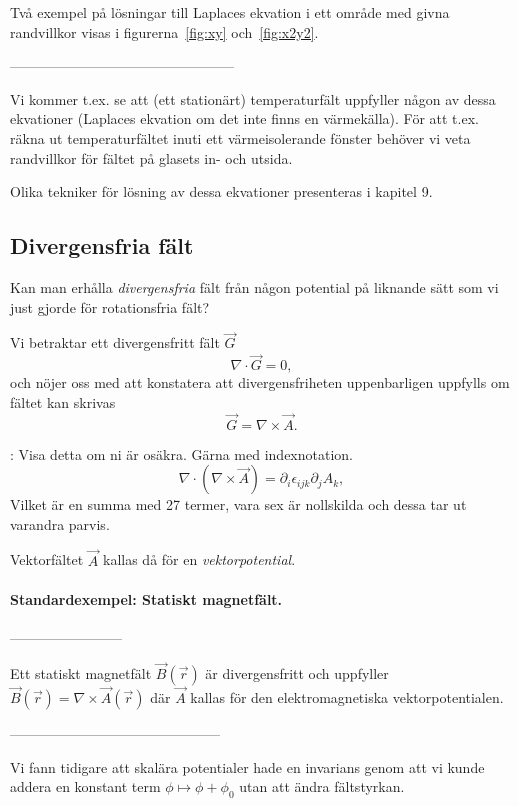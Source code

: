 \documentclass[%
oneside,                 %
final,                   %
10pt]{article}
\newcommand{\longinlinecomment}[3]{{\color{red}{\bf #1}: #2}}
\begin{document}
Två exempel på lösningar till Laplaces ekvation i ett område med givna randvillkor visas i figurerna~\ref{fig:xy} och~\ref{fig:x2y2}.

------------------------------------------------


Vi kommer t.ex. se att (ett stationärt) temperaturfält uppfyller någon av dessa ekvationer (Laplaces ekvation om det inte finns en värmekälla). För att t.ex. räkna ut temperaturfältet inuti ett värmeisolerande fönster behöver vi veta randvillkor för fältet på glasets in- och utsida.

Olika tekniker för lösning av dessa ekvationer presenteras i kapitel 9.

\subsection{Divergensfria fält}

Kan man erhålla \emph{divergensfria} fält från någon potential på liknande sätt som vi just gjorde för rotationsfria fält?

Vi betraktar ett divergensfritt fält $\vec{G}$
$$
\nabla \cdot \vec{G} = 0,
$$
och nöjer oss med att konstatera att divergensfriheten uppenbarligen uppfylls om fältet kan skrivas
\begin{equation}
\vec{G} = \nabla \times \vec{A}.
\end{equation}

\longinlinecomment{Kommentar 4}{ Visa detta om ni är osäkra. Gärna med indexnotation. $$ \nabla \cdot (\nabla \times \vec{A}) = \partial_i \epsilon_{ijk} \partial_j A_k, $$ Vilket är en summa med 27 termer, vara sex är nollskilda och dessa tar ut varandra parvis. }{ Visa detta om ni }

Vektorfältet $\vec{A}$ kallas då för en \emph{vektorpotential}.

\paragraph{Standardexempel: Statiskt magnetfält.}
------------------------

Ett statiskt magnetfält $\vec{B}(\vec{r})$ är divergensfritt och uppfyller $\vec{B}(\vec{r}) = \nabla \times \vec{A}(\vec{r})$ där $\vec{A}$ kallas för den elektromagnetiska vektorpotentialen.

---------------------------------------------

Vi fann tidigare att skalära potentialer hade en invarians genom att vi kunde addera en konstant term $\phi \mapsto \phi + \phi_0$ utan att ändra fältstyrkan.
\end{document}
